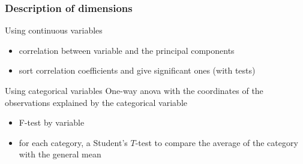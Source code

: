 \documentclass{beamer}\usepackage[]{graphicx}\usepackage[]{color}
\begin{document}


\begin{frame}[fragile]
\frametitle{Description of  dimensions}
  
  \begin{block}{Using continuous variables}
    \begin{itemize}
      \item correlation between variable and the principal components
      \item sort correlation coefficients and give significant ones (with tests)
    \end{itemize}
  \end{block}
  
  \begin{block}{Using categorical variables}
    One-way anova with the coordinates of the observations explained by the categorical variable
    \begin{itemize}
      \item F-test by variable
      \item for each category, a Student's $T$-test to compare the average of the category with the general mean
    \end{itemize}
  \end{block}

\end{frame}
\end{document}
